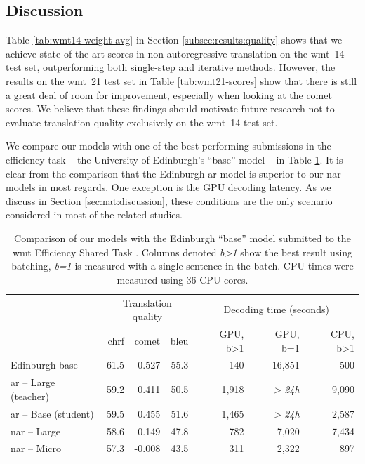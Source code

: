 \subsection{Discussion}%
\label{subsec:results:discussion}

Table \ref{tab:wmt14-weight-avg} in Section \ref{subsec:results:quality} shows
that we achieve state-of-the-art scores in non-autoreg\-ressive translation on the
\acs{wmt}~14 test set, outperforming both single-step and iterative
methods. However, the results on the \acs{wmt}~21 test set in Table
\ref{tab:wmt21-scores} show that there is still a great deal of room for
improvement, especially when looking at the \acs{comet} scores. We believe that
these findings should motivate future research not to evaluate translation
quality exclusively on the \acs{wmt}~14 test set.

We compare our models with one of the best performing submissions in the
efficiency task -- the University of Edinburgh's ``base'' model
\citep{Behnke-wmt21-speed} -- in Table \ref{tab:efficiency:comparison}. It is
clear from the comparison that the Edinburgh \acl{ar} model is superior to our
\ac{nar} models in most regards. One exception is the GPU decoding latency. As
we discuss in Section \ref{sec:nat:discussion}, these conditions are the only
scenario considered in most of the related studies.

\begin{table}
  \centering

  \begin{tabular}{lrrrrrr}
    \toprule
    & \multicolumn{3}{c}{Translation quality} & \multicolumn{3}{c}{Decoding time (seconds)} \\
    & {\small \acs{chrf}} & {\small \acs{comet}} & {\small \acs{bleu}} & {\small GPU, b>1} & {\small GPU, b=1} & {\small CPU, b>1} \\
    \midrule
    Edinburgh base & 61.5 & 0.527 & 55.3 & 140 & 16,851 & 500 \\
    \midrule
    \acs{ar} -- Large (teacher) & 59.2 & 0.411 & 50.5 & 1,918 & {\it > 24h} & 9,090 \\
    \acs{ar} -- Base (student) & 59.5 & 0.455 & 51.6 & 1,465 & {\it > 24h} & 2,587 \\
    \addlinespace
    \acs{nar} -- Large & 58.6 & 0.149 & 47.8 & 782 & 7,020 & 7,434 \\
    \acs{nar} -- Micro & 57.3 & -0.008 & 43.5 & 311 & 2,322 & 897 \\
    \bottomrule
  \end{tabular}

  \caption{Comparison of our models with the Edinburgh ``base'' model submitted
    to the \acs{wmt} Efficiency Shared Task \citep{Behnke-wmt21-speed}. Columns
    denoted \emph{b>1} show the best result using batching, \emph{b=1} is
    measured with a single sentence in the batch. CPU times were measured using
    36 CPU cores.} %
  \label{tab:efficiency:comparison}
\end{table}

